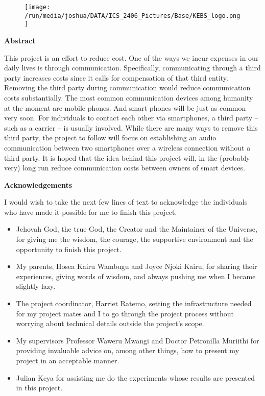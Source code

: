 \documentclass[12pt,svgnames,smaller]{article} %
\begin{document}
\begin{figure}[b] 
\begin{center}  
\texttt{[image: /run/media/joshua/DATA/ICS\_2406\_Pictures/Base/KEBS\_logo.png]}
\end{center}  
\end{figure}
\newpage
\textbf{Abstract}

This project is an effort to reduce cost. One of the ways we incur expenses in our daily lives is through communication. Specifically, communicating through a third party increases costs since it calls for compensation of that third entity. Removing the third party during communication would reduce communication costs substantially. The most common communication devices among humanity at the moment are mobile phones. And smart phones will be just as common very soon. For individuals to contact each other via smartphones, a third party – such as a carrier – is usually involved. While there are many ways to remove this third party, the project to follow will focus on establishing an audio communication between two smartphones over a wireless connection without a third party. It is hoped that the idea behind this project will, in the (probably very) long run reduce communication costs between owners of smart devices. 

\clearpage
\textbf{Acknowledgements}

I would wish to take the next few lines of text to acknowledge the individuals who have made it possible for me to finish this project.

\begin{itemize}
	\item Jehovah God, the true God, the Creator and the Maintainer of the Universe, for giving me the wisdom, the courage, the supportive environment and the opportunity to finish this project.
	\item My parents, Hosea Kairu Wambugu and Joyce Njoki Kairu, for sharing their experiences, giving words of wisdom, and always pushing me when I became slightly lazy.
	\item The project coordinator, Harriet Ratemo, setting the infrastructure needed for my project mates and I to go through the project process without worrying about technical details outside the project's scope.
	\item My supervisors Professor Waweru Mwangi and Doctor Petronilla Muriithi for providing invaluable advice on, among other things, how to present my project in an acceptable manner.
	\item Julian Keya for assisting me do the experiments whose results are presented in this project.
\end{itemize}
\end{document}
